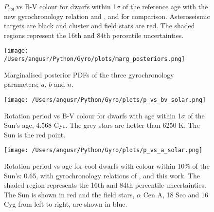 \documentclass[10pt,preprint]{aastex}
\newcommand{\prot}{$P_{rot}~$}
\begin{document}
\begin{figure}[ht]
\begin{center}
    \end{center}
    \caption{ \prot vs B-V colour for dwarfs within 1$\sigma$ of the reference age with the new gyrochronology relation and \citet{Barnes2007}, and \citet{Mamajek2008} for comparison. Asteroseismic targets are black and cluster and field stars are red. The shaded regions represent the 16th and 84th percentile uncertainties.
     }
   \label{fig:subfigures2}
\end{figure}

\begin{figure}[ht]
\begin{center}
\texttt{[image: /Users/angusr/Python/Gyro/plots/marg\_posteriors.png]}
\caption{Marginalised posterior PDFs of the three gyrochronology parameters; $a$, $b$ and $n$.}
\label{fig:marg_posteriors}
\end{center}
\end{figure}

\begin{figure}[ht]
\begin{center}
\texttt{[image: /Users/angusr/Python/Gyro/plots/p\_vs\_bv\_solar.png]}
\caption{Rotation period vs B-V colour for dwarfs with age within 1$\sigma$ of the Sun's age, 4.568 Gyr. The grey stars are hotter than 6250 K. The Sun is the red point.}
\label{fig:p_vs_bv_solar}
\end{center}
\end{figure}

\begin{figure}[ht]
\begin{center}
\texttt{[image: /Users/angusr/Python/Gyro/plots/p\_vs\_a\_solar.png]}
\caption{Rotation period vs age for cool dwarfs with colour within 10\% of the Sun's: 0.65, with gyrochronology relations of \citet{Barnes2007}, \citet{Mamajek2008} and this work. The shaded region represents the 16th and 84th percentile uncertainties. The Sun is shown in red and the field stars, $\alpha$ Cen A, 18 Sco and 16 Cyg from left to right, are shown in blue.}
\label{fig:p_vs_a_solar}
\end{center}
\end{figure}
\end{document}
